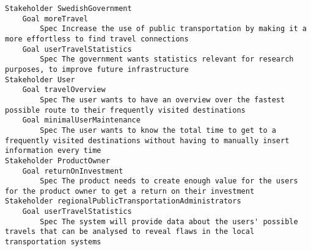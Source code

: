 

\begin{lstlisting}
Stakeholder SwedishGovernment
	Goal moreTravel
		Spec Increase the use of public transportation by making it a more effortless to find travel connections
	Goal userTravelStatistics
		Spec The government wants statistics relevant for research purposes, to improve future infrastructure
Stakeholder User
	Goal travelOverview
		Spec The user wants to have an overview over the fastest possible route to their frequently visited destinations
	Goal minimalUserMaintenance
		Spec The user wants to know the total time to get to a frequently visited destinations without having to manually insert information every time
Stakeholder ProductOwner
	Goal returnOnInvestment
		Spec The product needs to create enough value for the users for the product owner to get a return on their investment
Stakeholder regionalPublicTransportationAdministrators
	Goal userTravelStatistics
		Spec The system will provide data about the users' possible travels that can be analysed to reveal flaws in the local transportation systems

\end{lstlisting}